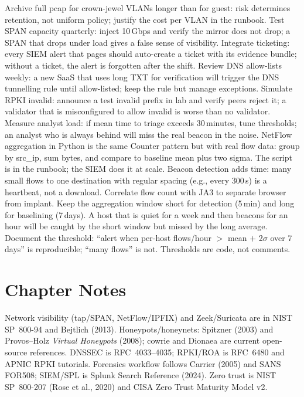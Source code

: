 Archive full pcap for crown-jewel VLANs longer than for guest: risk determines retention, not uniform policy; justify the cost per VLAN in the runbook.
Test SPAN capacity quarterly: inject 10\,Gbps and verify the mirror does not drop; a SPAN that drops under load gives a false sense of visibility.
Integrate ticketing: every SIEM alert that pages should auto-create a ticket with its evidence bundle; without a ticket, the alert is forgotten after the shift.
Review DNS allow-lists weekly: a new SaaS that uses long TXT for verification will trigger the DNS tunnelling rule until allow-listed; keep the rule but manage exceptions.
Simulate RPKI invalid: announce a test invalid prefix in lab and verify peers reject it; a validator that is misconfigured to allow invalid is worse than no validator.
Measure analyst load: if mean time to triage exceeds 30\,minutes, tune thresholds; an analyst who is always behind will miss the real beacon in the noise.
NetFlow aggregation in Python is the same Counter pattern but with real flow data: group by src\_ip, sum bytes, and compare to baseline mean plus two sigma. The script is in the runbook; the SIEM does it at scale.
Beacon detection adds time: many small flows to one destination with regular spacing (e.g., every 300\,s) is a heartbeat, not a download. Correlate flow count with JA3 to separate browser from implant.
Keep the aggregation window short for detection (5\,min) and long for baselining (7\,days). A host that is quiet for a week and then beacons for an hour will be caught by the short window but missed by the long average.
Document the threshold: ``alert when per-host flows/hour $>$ mean $+$ 2$\sigma$ over 7\,days'' is reproducible; ``many flows'' is not. Thresholds are code, not comments.
\section*{Chapter Notes}
Network visibility (tap/SPAN, NetFlow/IPFIX) and Zeek/Suricata are in NIST SP~800-94 and Bejtlich (2013). Honeypots/honeynets: Spitzner (2003) and Provos--Holz \textit{Virtual Honeypots} (2008); cowrie and Dionaea are current open-source references. DNSSEC is RFC~4033--4035; RPKI/ROA is RFC~6480 and APNIC RPKI tutorials. Forensics workflow follows Carrier (2005) and SANS FOR508; SIEM/SPL is Splunk Search Reference (2024). Zero trust is NIST SP~800-207 (Rose et al., 2020) and CISA Zero Trust Maturity Model v2.

